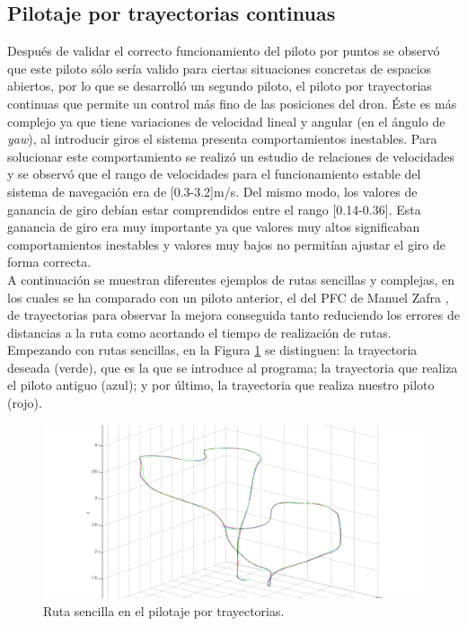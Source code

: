 \subsection{Pilotaje por trayectorias continuas}
\hspace{1cm} Después de validar el correcto funcionamiento del piloto por puntos se observó que este piloto sólo sería valido para ciertas situaciones concretas de espacios abiertos, por lo que se desarrolló un segundo piloto, el piloto por trayectorias continuas que permite un control más fino de las posiciones del dron. Éste es más complejo ya que tiene variaciones de velocidad lineal y angular (en el ángulo de \textit{yaw}), al introducir giros el sistema presenta comportamientos inestables. Para solucionar este comportamiento se realizó un estudio de relaciones de velocidades y se observó que el rango de velocidades para el funcionamiento estable del sistema de navegación era de [0.3-3.2]m/s. Del mismo modo, los valores de ganancia de giro debían estar comprendidos entre el rango [0.14-0.36]. Esta ganancia de giro era muy importante ya que valores muy altos significaban comportamientos inestables y valores muy bajos no permitían ajustar el giro de forma correcta. 
\\

\hspace{1cm} A continuación se muestran diferentes ejemplos de rutas sencillas y complejas, en los cuales se ha comparado con un piloto anterior, el del PFC de Manuel Zafra \cite{ManuelZafra}, de trayectorias para observar la mejora conseguida tanto reduciendo los errores de distancias a la ruta como acortando el tiempo de realización de rutas.
\\

\hspace{1cm} Empezando con rutas sencillas, en la Figura \ref{fig:Ruta sencilla en trayectoria.} se distinguen: la trayectoria deseada (verde), que es la que se introduce al programa; la trayectoria que realiza el piloto antiguo (azul); y por último, la trayectoria que realiza nuestro piloto (rojo).

\begin{figure}[H]
	\begin{center}
		\includegraphics[width=1.1\textwidth]{imag/IMG40.png}
				\caption{Ruta sencilla en el pilotaje por trayectorias.}
		\label{fig:Ruta sencilla en trayectoria.}	
	\end{center}
\end{figure}

